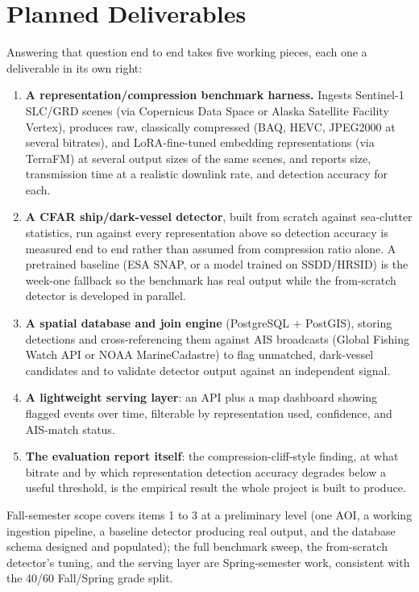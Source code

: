 \documentclass[11pt]{article}
\begin{document}
\section{Planned Deliverables}

Answering that question end to end takes five working pieces, each one a deliverable in its own right:

\begin{enumerate}[leftmargin=*]
\item \textbf{A representation/compression benchmark harness.} Ingests Sentinel-1 SLC/GRD scenes (via Copernicus Data Space or Alaska Satellite Facility Vertex), produces raw, classically compressed (BAQ, HEVC, JPEG2000 at several bitrates), and LoRA-fine-tuned embedding representations (via TerraFM) at several output sizes of the same scenes, and reports size, transmission time at a realistic downlink rate, and detection accuracy for each.
\item \textbf{A CFAR ship/dark-vessel detector}, built from scratch against sea-clutter statistics, run against every representation above so detection accuracy is measured end to end rather than assumed from compression ratio alone. A pretrained baseline (ESA SNAP, or a model trained on SSDD/HRSID) is the week-one fallback so the benchmark has real output while the from-scratch detector is developed in parallel.
\item \textbf{A spatial database and join engine} (PostgreSQL + PostGIS), storing detections and cross-referencing them against AIS broadcasts (Global Fishing Watch API or NOAA MarineCadastre) to flag unmatched, dark-vessel candidates and to validate detector output against an independent signal.
\item \textbf{A lightweight serving layer}: an API plus a map dashboard showing flagged events over time, filterable by representation used, confidence, and AIS-match status.
\item \textbf{The evaluation report itself}: the compression-cliff-style finding, at what bitrate and by which representation detection accuracy degrades below a useful threshold, is the empirical result the whole project is built to produce.
\end{enumerate}

Fall-semester scope covers items 1 to 3 at a preliminary level (one AOI, a working ingestion pipeline, a baseline detector producing real output, and the database schema designed and populated); the full benchmark sweep, the from-scratch detector's tuning, and the serving layer are Spring-semester work, consistent with the 40/60 Fall/Spring grade split.
\end{document}
